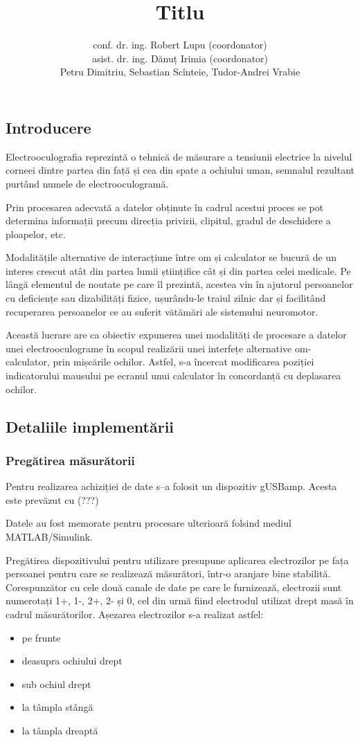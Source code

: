 \documentclass[12pt]{article}
\author{conf. dr. ing. Robert Lupu (coordonator)\\asist. dr. ing. Dănuț Irimia (coordonator)\\Petru Dimitriu, Sebastian Scînteie, Tudor-Andrei Vrabie}
\title{Titlu}
\begin{document}
	\maketitle
	
	\begin{multicols}{2}
	\subsection*{Introducere}
	Electrooculografia reprezintă o tehnică de măsurare a tensiunii electrice la nivelul corneei dintre partea din față și cea din spate a ochiului uman, semnalul rezultant purtând numele de electrooculogramă.
	
	Prin procesarea adecvată a datelor obținute în cadrul acestui proces se pot determina informații precum direcția privirii, clipitul, gradul de deschidere a ploapelor, etc.
	
	Modalitățile alternative de interacțiune între om și calculator se bucură de un interes crescut atât din partea lumii științifice cât și din partea celei medicale. Pe lângă elementul de noutate pe care îl prezintă, acestea vin în ajutorul persoanelor cu deficiențe sau dizabilități fizice, ușurându-le traiul zilnic dar și facilitând recuperarea persoanelor ce au suferit vătămări ale sistemului neuromotor.
	
	Această lucrare are ca obiectiv expunerea unei modalități de procesare a datelor unei electrooculograme în scopul realizării unei interfețe alternative om-calculator, prin mișcările ochilor. Astfel, s-a încercat modificarea poziției indicatorului mausului pe ecranul unui calculator în concordanță cu deplasarea ochilor.
	
	\subsection*{Detaliile implementării}
	\subsubsection*{Pregătirea măsurătorii}
	Pentru realizarea achiziției de date s–a folosit un dispozitiv gUSBamp. Acesta este prevăzut cu (???)
	
	Datele au fost memorate pentru procesare ulterioară folsind mediul MATLAB/Simulink.
	
	Pregătirea dispozitivului pentru utilizare presupune aplicarea electrozilor pe fața persoanei pentru care se realizează măsurători, într-o aranjare bine stabilită. Corespunzător cu cele două canale de date pe care le furnizează, electrozii sunt numerotați 1+, 1-, 2+, 2- și 0, cel din urmă fiind electrodul utilizat drept masă în cadrul măsurătorilor. Așezarea electrozilor s-a realizat astfel:
	\begin{itemize}
		\item [0] pe frunte
		\item [1+] deasupra ochiului drept
		\item [1-] sub ochiul drept
		\item [2+] la tâmpla stângă
		\item [2-] la tâmpla dreaptă
	\end{itemize}

\end{multicols}
\end{document}
